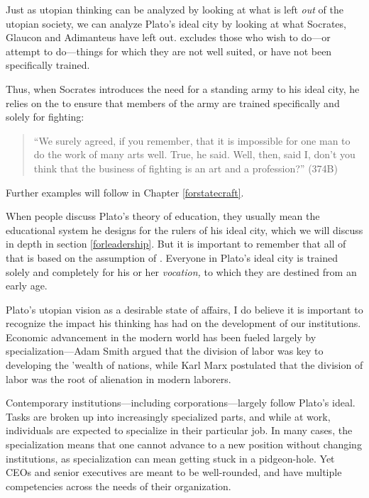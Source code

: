 Just as utopian thinking can be analyzed by looking at what is left \emph{out} of the utopian society, we can analyze Plato's ideal city by looking at what Socrates, Glaucon and Adimanteus have left out.  excludes those who wish to do---or attempt to do---things for which they are not well suited, or have not been specifically trained.

Thus, when Socrates introduces the need for a standing army to his ideal city, he relies on the  to ensure that members of the army are trained specifically and solely for fighting:

\begin{quote}

``We surely agreed, if you remember, that it is impossible for one man to do the work of many arts well.
True, he said.
Well, then, said I, don't you think that the business of fighting is an art and a profession?'' (374B)
\end{quote}

Further examples will follow in Chapter \ref{forstatecraft}.

When people discuss Plato's theory of education, they usually mean the educational system he designs for the rulers of his ideal city, which we will discuss in depth in section \ref{forleadership}. But it is important to remember that all of that is based on the assumption of . Everyone in Plato's ideal city is trained solely and completely for his or her \emph{vocation,} to which they are destined from an early age. 

 Plato's utopian vision as a desirable state of affairs, I do believe it is important to recognize the impact his thinking has had on the development of our institutions. Economic advancement in the modern world has been fueled largely by specialization---Adam Smith argued that the division of labor was key to developing the 'wealth of nations, while Karl Marx postulated that the division of labor was the root of alienation in modern laborers.

Contemporary institutions---including corporations---largely follow Plato's ideal. Tasks are broken up into increasingly specialized parts, and while at work, individuals are expected to specialize in their particular job. In many cases, the specialization means that one cannot advance to a new position without changing institutions, as specialization can mean getting stuck in a pidgeon-hole. Yet CEOs and senior executives are meant to be well-rounded, and have multiple competencies across the needs of their organization.

